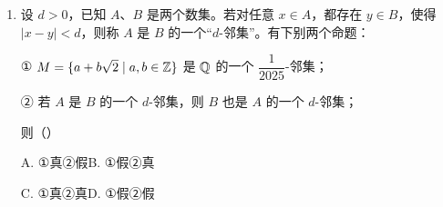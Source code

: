 \documentclass[a4paper,11pt]{article}
\begin{document}
\begin{enumerate}
\fi

\item 设 $d>0$，已知 $A$、$B$ 是两个数集。若对任意 $x\in A$，都存在 $y\in B$，使得 $|x-y|<d$，则称 $A$ 是 $B$ 的一个“$d$-邻集”。有下别两个命题：

① $M=\{a+b\sqrt2\mid a,b\in\mathbb{Z}\}$ 是 $\mathbb{Q}$ 的一个 $\dfrac1{2025}$-邻集；

② 若 $A$ 是 $B$ 的一个 $d$-邻集，则 $B$ 也是 $A$ 的一个 $d$-邻集；

则\mbox{（\quad）}

\keepwithprev
A. ①真②假\qquad B. ①假②真

C. ①真②真\qquad D. ①假②假


\ifanswer
\solbegin
{}
\solend

\fi

\end{enumerate}

\end{document}

